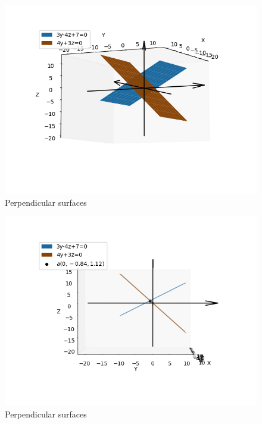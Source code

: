 \documentclass[journal,12pt,twocolumn]{IEEEtran}
\begin{document}
\begin{figure}[!ht]
\centering
\includegraphics[width=\columnwidth]{./figs/perperndi_foot_1.png}
\caption{Perpendicular surfaces}
\label{fig:Perpendicular surfaces}
\end{figure} 

\begin{figure}[!ht]
\centering
\includegraphics[width=\columnwidth]{./figs/perperndi_foot_2.png}
\caption{Perpendicular surfaces}
\label{fig:Perpendicular surfaces_point}
\end{figure}
\end{document}
